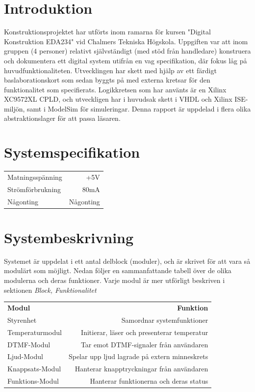 \documentclass[a4paper,11pt]{article}
\begin{document}
\section{Introduktion}

	Konstruktionsprojektet har utförts inom ramarna för kursen "Digital Konstruktion EDA234" vid Chalmers Tekniska Högskola.
	Uppgiften var att inom gruppen (4 personer) relativt självständigt (med stöd från handledare) konstruera och dokumentera
	ett digital system utifrån en vag specifikation, där fokus låg på huvudfunktionaliteten.
	Utvecklingen har skett med hjälp av ett färdigt baslaborationskort som sedan byggts på med externa kretsar för den funktionalitet
	som specifierats. Logikkretsen som har använts är en Xilinx XC9572XL CPLD, och utveckligen har i huvudsak skett i VHDL och Xilinx ISE-miljön,
	samt i ModelSim för simuleringar. Denna rapport är uppdelad i flera olika abstraktionslager för att passa läsaren. 

\section{Systemspecifikation}

	\begin{tabular}{ l r}
	   Matningsspänning & +5V\\
	   Strömförbrukning & ~80mA\\
	   Någonting & Någonting\\
	\end{tabular}

\section{Systembeskrivning}

	Systemet är uppdelat i ett antal delblock (moduler), och är skrivet för att vara så modulärt som möjligt.
	Nedan följer en sammanfattande tabell över de olika modulerna och deras funktioner. Varje modul är mer
	utförligt beskriven i sektionen {\it Block, Funktionalitet}

	\begin{tabular}{ l r}
		{\bf Modul} & {\bf Funktion}\\
	   	Styrenhet & Samordnar systemfunktioner\\
	  	Temperaturmodul & Initierar, läser och presenterar temperatur\\
	   	DTMF-Modul & Tar emot DTMF-signaler från användaren\\
		Ljud-Modul & Spelar upp ljud lagrade på extern minneskrets\\
		Knappsats-Modul & Hanterar knapptryckningar från användaren\\
		Funktions-Modul & Hanterar funktionerna och deras status\\
	\end{tabular}
\end{document}
